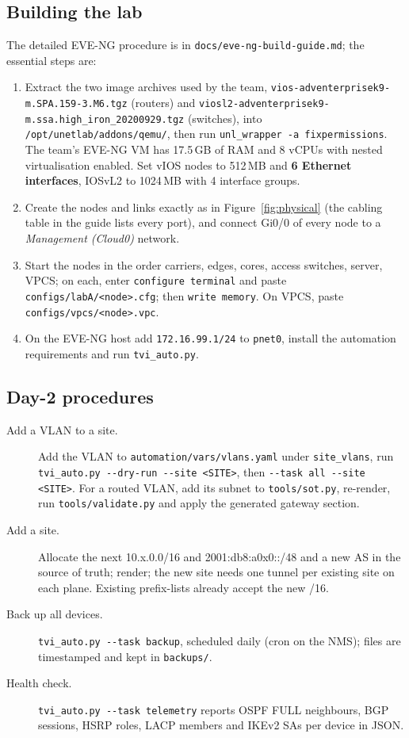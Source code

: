 \documentclass[11pt,a4paper]{article}
\begin{document}
\subsection{Building the lab}
The detailed EVE-NG procedure is in \texttt{docs/eve-ng-build-guide.md}; the essential steps are:
\begin{enumerate}
\item Extract the two image archives used by the team, \texttt{vios-adventerprisek9-m.SPA.159-3.M6.tgz} (routers) and \texttt{viosl2-adventerprisek9-m.ssa.high\_iron\_20200929.tgz} (switches), into \texttt{/opt/unetlab/addons/qemu/}, then run \texttt{unl\_wrapper -a fixpermissions}. The team's EVE-NG VM has 17.5\,GB of RAM and 8 vCPUs with nested virtualisation enabled. Set vIOS nodes to 512\,MB and \textbf{6 Ethernet interfaces}, IOSvL2 to 1024\,MB with 4 interface groups.
\item Create the nodes and links exactly as in Figure~\ref{fig:physical} (the cabling table in the guide lists every port), and connect Gi0/0 of every node to a \emph{Management (Cloud0)} network.
\item Start the nodes in the order carriers, edges, cores, access switches, server, VPCS; on each, enter \texttt{configure terminal} and paste \texttt{configs/labA/<node>.cfg}; then \texttt{write memory}. On VPCS, paste \texttt{configs/vpcs/<node>.vpc}.
\item On the EVE-NG host add \texttt{172.16.99.1/24} to \texttt{pnet0}, install the automation requirements and run \texttt{tvi\_auto.py}.
\end{enumerate}

\subsection{Day-2 procedures}
\begin{description}
\item[Add a VLAN to a site.] Add the VLAN to \texttt{automation/vars/vlans.yaml} under \texttt{site\_vlans}, run \texttt{tvi\_auto.py -{}-dry-run -{}-site <SITE>}, then \texttt{-{}-task all -{}-site <SITE>}. For a routed VLAN, add its subnet to \texttt{tools/sot.py}, re-render, run \texttt{tools/validate.py} and apply the generated gateway section.
\item[Add a site.] Allocate the next 10.x.0.0/16 and 2001:db8:a0x0::/48 and a new AS in the source of truth; render; the new site needs one tunnel per existing site on each plane. Existing prefix-lists already accept the new /16.
\item[Back up all devices.] \texttt{tvi\_auto.py -{}-task backup}, scheduled daily (cron on the NMS); files are timestamped and kept in \texttt{backups/}.
\item[Health check.] \texttt{tvi\_auto.py -{}-task telemetry} reports OSPF FULL neighbours, BGP sessions, HSRP roles, LACP members and IKEv2 SAs per device in JSON.
\end{description}
\end{document}
